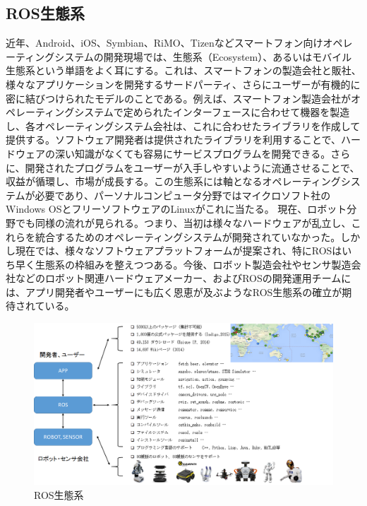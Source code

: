 \subsection{ROS生態系}

近年、Android、iOS、Symbian、RiMO、Tizenなどスマートフォン向けオペレーティングシステムの開発現場では、生態系（Ecosystem）、あるいはモバイル生態系という単語をよく耳にする。これは、スマートフォンの製造会社と販社、様々なアプリケーションを開発するサードパーティ、さらにユーザーが有機的に密に結びつけられたモデルのことである。例えば、スマートフォン製造会社がオペレーティングシステムで定められたインターフェースに合わせて機器を製造し、各オペレーティングシステム会社は、これに合わせたライブラリを作成して提供する。ソフトウェア開発者は提供されたライブラリを利用することで、ハードウェアの深い知識がなくても容易にサービスプログラムを開発できる。さらに、開発されたプログラムをユーザーが入手しやすいように流通させることで、収益が循環し、市場が成長する。この生態系には軸となるオペレーティングシステムが必要であり、パーソナルコンピュータ分野ではマイクロソフト社のWindows OSとフリーソフトウェアのLinuxがこれに当たる。
現在、ロボット分野でも同様の流れが見られる。つまり、当初は様々なハードウェアが乱立し、これらを統合するためのオペレーティングシステムが開発されていなかった。しかし現在では、様々なソフトウェアプラットフォームが提案され、特にROSはいち早く生態系の枠組みを整えつつある。今後、ロボット製造会社やセンサ製造会社などのロボット関連ハードウェアメーカー、およびROSの開発運用チームには、アプリ開発者やユーザーにも広く恩恵が及ぶようなROS生態系の確立が期待されている。

\begin{figure}[h]
  \centering
  \includegraphics[width=\columnwidth]{pictures/chapter1/pic_01_03.png}
  \caption{ROS生態系}
\end{figure}

